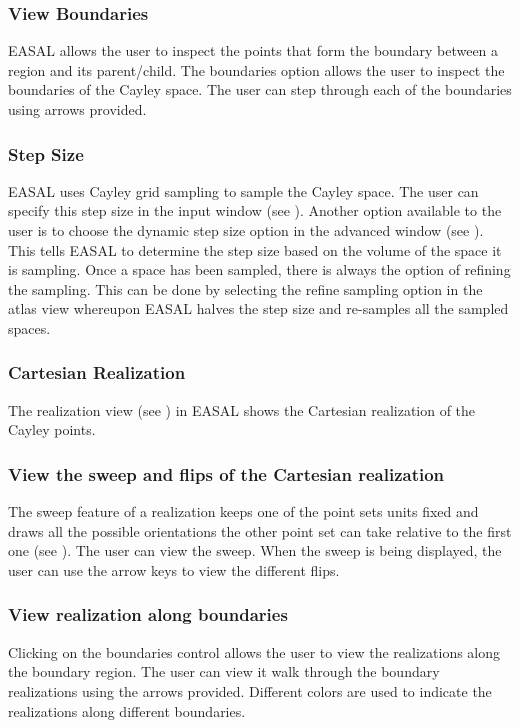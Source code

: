 \documentclass[10pt]{article}
\begin{document}
\subsubsection{View Boundaries}
EASAL allows the user to inspect the points that form the boundary between a
region and its parent/child.  The boundaries option allows the user to inspect
the boundaries of the Cayley space. The user can step through each of the
boundaries using arrows provided.

\subsubsection{Step Size}
EASAL uses Cayley grid sampling to sample the Cayley space. The user can
specify this step size in the input window (see ). Another
option available to the user is to choose the dynamic step size option in the
advanced window (see ). This tells EASAL to determine
the step size based on the volume of the space it is sampling. Once a space has
been sampled, there is always the option of refining the sampling.  This can be
done by selecting the refine sampling option in the atlas view whereupon EASAL
halves the step size and re-samples all the sampled spaces.

\subsubsection{Cartesian Realization}
The realization view (see ) in EASAL shows the
Cartesian realization of the Cayley points.

\subsubsection{View the sweep and flips of the Cartesian realization}
The sweep feature of a realization keeps one of the point sets units fixed and
draws all the possible orientations the other point set can take relative to
the first one (see ). The user can view the sweep. When
the sweep is being displayed, the user can use the arrow keys to view the
different flips.

\subsubsection{View realization along boundaries}
Clicking on the boundaries control allows the user to view the realizations
along the boundary region. The user can view it walk through the boundary
realizations using the arrows provided. Different colors are used to indicate
the realizations along different boundaries.
\end{document}
